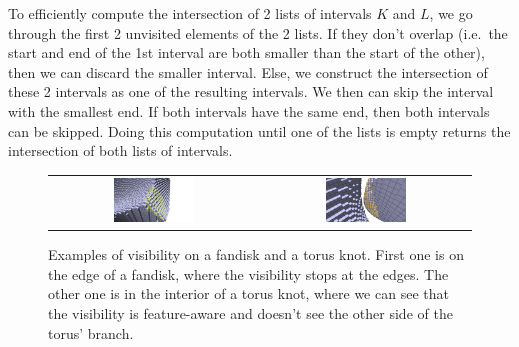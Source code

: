 To efficiently compute the intersection of 2 lists of intervals $K$ and $L$, we go through the first 2 unvisited
elements of the 2 lists. If they don't overlap (i.e.\ the start and end of the 1st interval are both smaller than
the start of the other), then we can discard the smaller interval. Else, we construct the intersection of these
2 intervals as one of the resulting intervals. We then can skip the interval with the smallest end. If both
intervals have the same end, then both intervals can be skipped. Doing this computation until one of the lists
is empty returns the intersection of both lists of intervals.


\begin{figure}
  \centering
  \begin{tabular}{c c}
    \includegraphics[width=0.4\textwidth]{pictures/visibility_from_given_point_r_10} &
    \includegraphics[width=0.4\textwidth]{pictures/visibility_aware_of_features}
  \end{tabular}
  \caption{Examples of visibility on a fandisk and a torus knot. First one is on the edge
    of a fandisk, where the visibility stops at the edges. The other one is in the interior
    of a torus knot, where we can see that the visibility is feature-aware and doesn't see
    the other side of the torus' branch.}
  \label{fig:visibility-results}
\end{figure}
%


